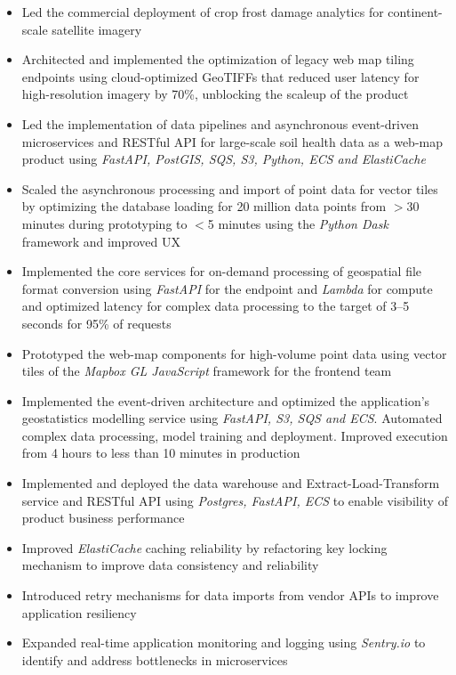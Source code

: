\begin{itemize}
  \item Led the commercial deployment of crop frost damage analytics for continent-scale satellite imagery
  \item Architected and implemented the optimization of legacy web map tiling endpoints using cloud-optimized GeoTIFFs that reduced user latency for high-resolution imagery by 70\%, unblocking the scaleup of the product
  \item Led the implementation of data pipelines and asynchronous event-driven microservices and RESTful API for large-scale soil health data as a web-map product using \emph{FastAPI, PostGIS, SQS, S3, Python, ECS and ElastiCache}
  \item Scaled the asynchronous processing and import of point data for vector tiles by optimizing the database loading for 20 million data points from $>$30 minutes during prototyping to $<$5 minutes using the \emph{Python Dask} framework and improved UX
  \item Implemented the core services for on-demand processing of geospatial file format conversion using \emph{FastAPI} for the endpoint and \emph{Lambda} for compute and optimized latency for complex data processing to the target of 3--5 seconds for 95\% of requests
  \item Prototyped the web-map components for high-volume point data using vector tiles of the \emph{Mapbox GL JavaScript} framework for the frontend team
  \item Implemented the event-driven architecture and optimized the application's geostatistics modelling service using \emph{FastAPI, S3, SQS and ECS}. Automated complex data processing, model training and deployment. Improved execution from 4 hours to less than 10 minutes in production
  \item Implemented and deployed the data warehouse and Extract-Load-Transform service and RESTful API using \emph{Postgres, FastAPI, ECS} to enable visibility of product business performance
  \item Improved \emph{ElastiCache} caching reliability by refactoring key locking mechanism to improve data consistency and reliability
  \item Introduced retry mechanisms for data imports from vendor APIs to improve application resiliency
  \item Expanded real-time application monitoring and logging using \emph{Sentry.io} to identify and address bottlenecks in microservices

\end{itemize}
